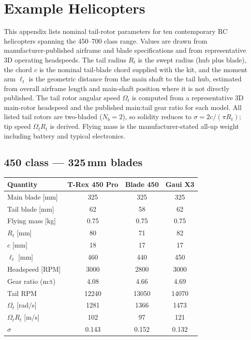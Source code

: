 \documentclass[11pt,a4paper]{article}
\newcommand{\OmegaT}{\Omega_t}
\newcommand{\Rt}{R_t}
\let\oldsection\section
\renewcommand{\section}{\clearpage\oldsection}
\begin{document}
\section{Example Helicopters}\label{app:helicopters}

This appendix lists nominal tail-rotor parameters for ten contemporary RC
helicopters spanning the 450--700 class range. Values are drawn from
manufacturer-published airframe and blade specifications and from
representative 3D operating headspeeds. The tail radius \(\Rt\) is the
swept radius (hub plus blade), the chord \(c\) is the nominal tail-blade
chord supplied with the kit, and the moment arm \(\ell_t\) is the
geometric distance from the main shaft to the tail hub, estimated from
overall airframe length and main-shaft position where it is not directly
published. The tail rotor angular speed \(\OmegaT\) is computed from a
representative 3D main-rotor headspeed and the published main:tail gear
ratio for each model. All listed tail rotors are two-bladed (\(N_b=2\)), so solidity reduces
to \(\sigma=2c/(\pi\Rt)\); tip speed \(\OmegaT\Rt\) is derived. Flying mass is the manufacturer-stated
all-up weight including battery and typical electronics.

\subsection{450 class --- 325\,mm blades}\label{app:cls450}

\begin{center}
\renewcommand{\arraystretch}{1.2}
\small
\begin{tabular}{lccc}
\toprule
Quantity & T-Rex 450 Pro & Blade 450 & Gaui X3 \\
\midrule
Main blade [mm]       & 325   & 325   & 325   \\
Tail blade [mm]       & 62    & 58    & 62    \\
Flying mass [kg]      & 0.75  & 0.75  & 0.75  \\
\(\Rt\) [mm]          & 80    & 71    & 82    \\
\(c\) [mm]            & 18    & 17    & 17    \\
\(\ell_t\) [mm]       & 460   & 440   & 450   \\
Headspeed [RPM]       & 3000  & 2800  & 3000  \\
Gear ratio (m:t)      & 4.08  & 4.66  & 4.69  \\
Tail RPM              & 12240 & 13050 & 14070 \\
\(\OmegaT\) [rad/s]   & 1281  & 1366  & 1473  \\
\(\OmegaT\Rt\) [m/s]  & 102   & 97    & 121   \\
\(\sigma\)            & 0.143 & 0.152 & 0.132 \\
\bottomrule
\end{tabular}
\end{center}
\end{document}
